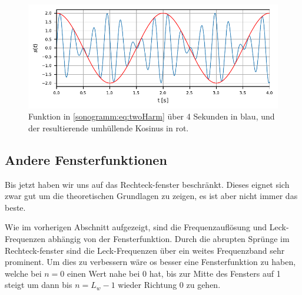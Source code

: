 \begin{figure}
    \centering
    \includegraphics{papers/sonogramm/images/twoharmTime.pdf}
    \caption{Funktion in \eqref{sonogramm:eq:twoHarm} über 4 Sekunden in blau, und der resultierende
    umhüllende Kosinus in rot.
    \label{sonogramm:twoHarmTime}
    }
\end{figure}

\subsection{Andere Fensterfunktionen}
Bis jetzt haben wir uns auf das Rechteck-fenster beschränkt.
Dieses eignet sich zwar gut um die theoretischen Grundlagen zu zeigen,
es ist aber nicht immer das beste.

Wie im vorherigen Abschnitt aufgezeigt, sind die Frequenzauflösung und 
Leck-Frequenzen abhängig von der Fensterfunktion.
Durch die abrupten Sprünge im Rechteck-fenster sind die Leck-Frequenzen 
über ein weites Frequenzband sehr prominent.
Um dies zu verbessern wäre os besser eine Fensterfunktion zu haben,
welche bei $n = 0$ einen Wert nahe bei 0 hat,
bis zur Mitte des Fensters auf 1 steigt um dann bis $n = L_w -1$ wieder Richtung 0 zu gehen. 


